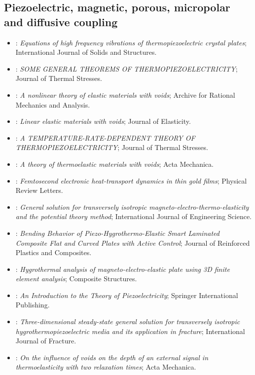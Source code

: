 \subsection{Piezoelectric, magnetic, porous, micropolar and diffusive coupling}
\begin{itemize}\itemsep0pt\small
\item \citet{Mindlin1974Thermopiezo}: \emph{Equations of high frequency vibrations of thermopiezoelectric crystal plates}; International Journal of Solids and Structures.
\item \citet{Nowacki1978}: \emph{SOME GENERAL THEOREMS OF THERMOPIEZOELECTRICITY}; Journal of Thermal Stresses.
\item \citet{Nunziato1979}: \emph{A nonlinear theory of elastic materials with voids}; Archive for Rational Mechanics and Analysis.
\item \citet{Cowin1983}: \emph{Linear elastic materials with voids}; Journal of Elasticity.
\item \citet{Chandrasekharaiah1984}: \emph{A TEMPERATURE-RATE-DEPENDENT THEORY OF THERMOPIEZOELECTRICITY}; Journal of Thermal Stresses.
\item \citet{Iesan1986}: \emph{A theory of thermoelastic materials with voids}; Acta Mechanica.
\item \citet{Brorson1987}: \emph{Femtosecond electronic heat-transport dynamics in thin gold films}; Physical Review Letters.
\item \citet{Chen2004}: \emph{General solution for transversely isotropic magneto-electro-thermo-elasticity and the potential theory method}; International Journal of Engineering Science.
\item \citet{Raja2004}: \emph{Bending Behavior of Piezo-Hygrothermo-Elastic Smart Laminated Composite Flat and Curved Plates with Active Control}; Journal of Reinforced Plastics and Composites.
\item \citet{Vinyas2017}: \emph{Hygrothermal analysis of magneto-electro-elastic plate using 3D finite element analysis}; Composite Structures.
\item \citet{Yang2018}: \emph{An Introduction to the Theory of Piezoelectricity}; Springer International Publishing.
\item \citet{Zhao2018}: \emph{Three-dimensional steady-state general solution for transversely isotropic hygrothermopiezoelectric media and its application in fracture}; International Journal of Fracture.
\item \citet{Carini2019}: \emph{On the influence of voids on the depth of an external signal in thermoelasticity with two relaxation times}; Acta Mechanica.

\end{itemize}
